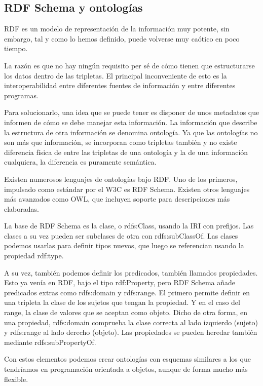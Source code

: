 \documentclass[openright,twoside,12pt]{book}
\begin{document}
\subsection{RDF Schema y ontologías}

RDF es un modelo de representación de la información muy potente, sin embargo, tal y como lo hemos definido, puede volverse muy caótico en poco tiempo.

La razón es que no hay ningún requisito per sé de cómo tienen que estructurarse los datos dentro de las tripletas. El principal inconveniente de esto es la interoperabilidad entre diferentes fuentes de información y entre diferentes programas.

Para solucionarlo, una idea que se puede tener es disponer de unos metadatos que informen de cómo se debe manejar esta información. La información que describe la estructura de otra información se denomina ontología. Ya que las ontologías no son más que información, se incorporan como tripletas también y no existe diferencia física de entre las tripletas de una ontología y la de una información cualquiera, la diferencia es puramente semántica. 

Existen numerosos lenguajes de ontologías bajo RDF. Uno de los primeros, impulsado como estándar por el W3C es RDF Schema\cite{rdfs}. Existen otros lenguajes más avanzados como OWL\cite{owl}, que incluyen soporte para descripciones más elaboradas.

La base de RDF Schema es la clase, o rdfs:Class, usando la IRI con prefijos. Las clases a su vez pueden ser subclases de otra con rdfs:subClassOf. Las clases podemos usarlas para definir tipos nuevos, que luego se referencian usando la propiedad rdf:type.

A su vez, también podemos definir los predicados, también llamados propiedades. Esto ya venía en RDF, bajo el tipo rdf:Property, pero RDF Schema añade predicados extras como rdfs:domain y rdfs:range. El primero permite definir en una tripleta la clase de los sujetos que tengan la propiedad. Y en el caso del range, la clase de valores que se aceptan como objeto. Dicho de otra forma, en una propiedad, rdfs:domain comprueba la clase correcta al lado izquierdo (sujeto) y rdfs:range al lado derecho (objeto). Las propiedades se pueden heredar también mediante rdfs:subPropertyOf.

Con estos elementos podemos crear ontologías con esquemas similares a los que tendríamos en programación orientada a objetos, aunque de forma mucho más flexible.
\end{document}
